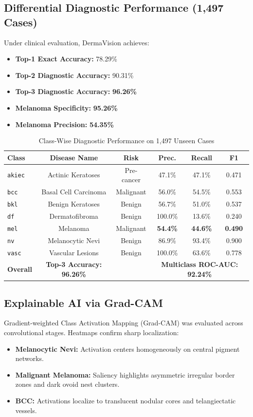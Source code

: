 ﻿\documentclass[conference]{IEEEtran}
\begin{document}
\subsection{Differential Diagnostic Performance (1,497 Cases)}
Under clinical evaluation, DermaVision achieves:
\begin{itemize}
    \item \textbf{Top-1 Exact Accuracy:} 78.29\%
    \item \textbf{Top-2 Diagnostic Accuracy:} 90.31\%
    \item \textbf{Top-3 Diagnostic Accuracy:} \textbf{96.26\%}
    \item \textbf{Melanoma Specificity:} \textbf{95.26\%}
    \item \textbf{Melanoma Precision:} \textbf{54.35\%}
\end{itemize}

\begin{table}[htbp]
\caption{Class-Wise Diagnostic Performance on 1,497 Unseen Cases}
\label{tab:classwise}
\centering
\begin{tabular}{lccccc}
\toprule
\textbf{Class} & \textbf{Disease Name} & \textbf{Risk} & \textbf{Prec.} & \textbf{Recall} & \textbf{F1} \\
\midrule
\texttt{akiec} & Actinic Keratoses & Pre-cancer & 47.1\% & 47.1\% & 0.471 \\
\texttt{bcc} & Basal Cell Carcinoma & Malignant & 56.0\% & 54.5\% & 0.553 \\
\texttt{bkl} & Benign Keratoses & Benign & 56.7\% & 51.0\% & 0.537 \\
\texttt{df} & Dermatofibroma & Benign & 100.0\% & 13.6\% & 0.240 \\
\texttt{mel} & Melanoma & Malignant & \textbf{54.4\%} & \textbf{44.6\%} & \textbf{0.490} \\
\texttt{nv} & Melanocytic Nevi & Benign & 86.9\% & 93.4\% & 0.900 \\
\texttt{vasc} & Vascular Lesions & Benign & 100.0\% & 63.6\% & 0.778 \\
\midrule
\textbf{Overall} & \textbf{Top-3 Accuracy: 96.26\%} & & \multicolumn{3}{c}{\textbf{Multiclass ROC-AUC: 92.24\%}} \\
\bottomrule
\end{tabular}
\end{table}

\subsection{Explainable AI via Grad-CAM}
Gradient-weighted Class Activation Mapping (Grad-CAM) \cite{selvaraju2017grad} was evaluated across convolutional stages. Heatmaps confirm sharp localization:
\begin{itemize}
    \item \textbf{Melanocytic Nevi:} Activation centers homogeneously on central pigment networks.
    \item \textbf{Malignant Melanoma:} Saliency highlights asymmetric irregular border zones and dark ovoid nest clusters.
    \item \textbf{BCC:} Activations localize to translucent nodular cores and telangiectatic vessels.
\end{itemize}
\end{document}
